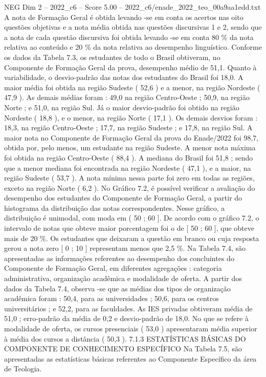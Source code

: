 \begin{textsample}{NEG Dim 2 – 2022\_c6 – Score 5.00 – 2022\_c6/enade\_2022\_teo\_00a9aa1edd.txt}
A nota de Formação Geral é obtida levando -se em conta os acertos nas oito questões objetivas e a nota média obtida nas questões discursivas 1 e 2, sendo que a nota de cada questão discursiva foi obtida levando -se em conta 80 \% da nota relativa ao conteúdo e 20 \% da nota relativa ao desempenho linguístico.
Conforme os dados da Tabela 7.3, os estudantes de todo o Brasil obtiveram, no Componente de Formação Geral da prova, desempenho médio de 51,1.
Quanto à variabilidade, o desvio-padrão das notas dos estudantes do Brasil foi 18,0.
A maior média foi obtida na região Sudeste ( 52,6 ) e a menor, na região Nordeste ( 47,9 ).
As demais médias foram : 49,0 na região Centro-Oeste ; 50,9, na região Norte ; e 51,0, na região Sul.
Já o maior desvio-padrão foi obtido na região Nordeste ( 18,8 ), e o menor, na região Norte ( 17,1 ).
Os demais desvios foram : 18,3, na região Centro-Oeste ; 17,7, na região Sudeste ; e 17,8, na região Sul.
A maior nota no Componente de Formação Geral da prova do Enade/2022 foi 98,7, obtida por, pelo menos, um estudante na região Sudeste.
A menor nota máxima foi obtida na região Centro-Oeste ( 88,4 ).
A mediana do Brasil foi 51,8 ; sendo que a menor mediana foi encontrada na região Nordeste ( 47,1 ), e a maior, na região Sudeste ( 53,7 ).
A nota mínima nessa parte foi zero em todas as regiões, exceto na região Norte ( 6,2 ).
No Gráfico 7.2, é possível verificar a avaliação do desempenho dos estudantes do Componente de Formação Geral, a partir do histograma da distribuição das notas correspondentes.
Nesse gráfico, a distribuição é unimodal, com moda em ( 50 ; 60 ].
De acordo com o gráfico 7.2, o intervalo de notas que obteve maior porcentagem foi o de [ 50 ; 60 ], que obteve mais de 20 \%.
Os estudantes que deixaram a questão em branco ou cuja resposta gerou a nota zero [ 0 ; 10 ] representam menos que 2,5 \%.
Na Tabela 7.4, são apresentadas as informações referentes ao desempenho dos concluintes do Componente de Formação Geral, em diferentes agregações : categoria administrativa, organização acadêmica e modalidade de oferta.
A partir dos dados da Tabela 7.4, observa -se que as médias dos tipos de organização acadêmica foram : 50,4, para as universidades ; 50,6, para os centros universitários ; e 52,2, para as faculdades.
As IES privadas obtiveram média de 51,0 ; erro-padrão da média de 0,2 e desvio-padrão de 18,0.
No que se refere à modalidade de oferta, os cursos presenciais ( 53,0 ) apresentaram média superior à média dos cursos a distância ( 50,3 ). 7.1.3 ESTATÍSTICAS BÁSICAS DO COMPONENTE DE CONHECIMENTO ESPECÍFICO Na Tabela 7.5, são apresentadas as estatísticas básicas referentes ao Componente Específico da área de Teologia.

\end{textsample}
